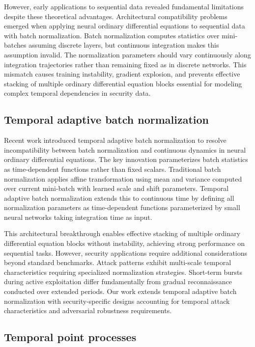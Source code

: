 \documentclass[10pt,journal,compsoc]{IEEEtran}
\begin{document}
However, early applications to sequential data revealed fundamental limitations despite these theoretical advantages. Architectural compatibility problems emerged when applying neural ordinary differential equations to sequential data with batch normalization. Batch normalization computes statistics over mini-batches assuming discrete layers, but continuous integration makes this assumption invalid. The normalization parameters should vary continuously along integration trajectories rather than remaining fixed as in discrete networks. This mismatch causes training instability, gradient explosion, and prevents effective stacking of multiple ordinary differential equation blocks essential for modeling complex temporal dependencies in security data.

\subsection{Temporal adaptive batch normalization}

Recent work introduced temporal adaptive batch normalization to resolve incompatibility between batch normalization and continuous dynamics in neural ordinary differential equations. The key innovation parameterizes batch statistics as time-dependent functions rather than fixed scalars. Traditional batch normalization applies affine transformation using mean and variance computed over current mini-batch with learned scale and shift parameters. Temporal adaptive batch normalization extends this to continuous time by defining all normalization parameters as time-dependent functions parameterized by small neural networks taking integration time as input.

This architectural breakthrough enables effective stacking of multiple ordinary differential equation blocks without instability, achieving strong performance on sequential tasks. However, security applications require additional considerations beyond standard benchmarks. Attack patterns exhibit multi-scale temporal characteristics requiring specialized normalization strategies. Short-term bursts during active exploitation differ fundamentally from gradual reconnaissance conducted over extended periods. Our work extends temporal adaptive batch normalization with security-specific designs accounting for temporal attack characteristics and adversarial robustness requirements.

\subsection{Temporal point processes}
\end{document}
